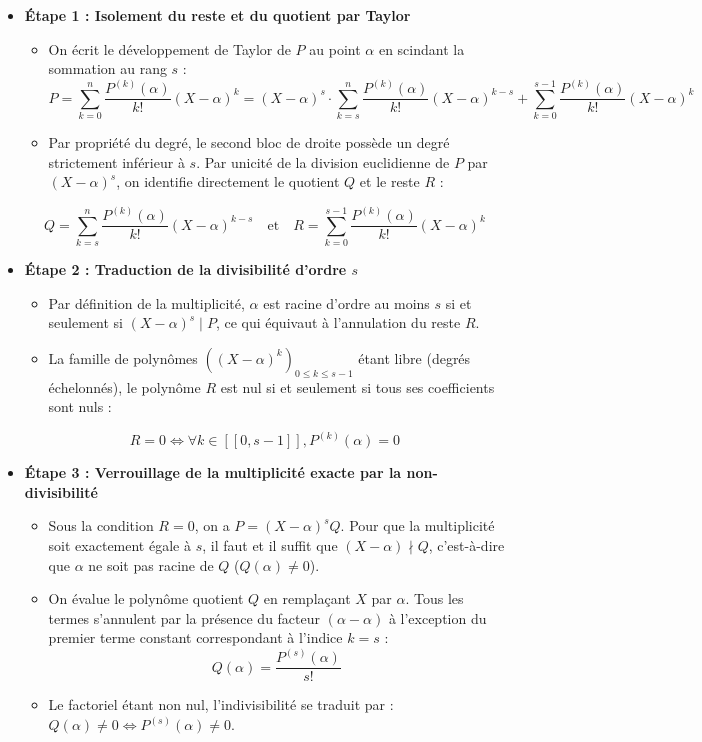 \documentclass[11pt, a4paper]{article}
\theoremstyle{definition}
\begin{document}
\begin{itemize}
\item \textbf{Étape 1 : Isolement du reste et du quotient par Taylor}
  \begin{itemize}
  \item On écrit le développement de Taylor de $P$ au point $\alpha$ en scindant la sommation au rang $s$ :
\[
P = \sum_{k=0}^n \frac{P^{(k)}(\alpha)}{k!}(X-\alpha)^k = (X-\alpha)^s \cdot \sum_{k=s}^n \frac{P^{(k)}(\alpha)}{k!}(X-\alpha)^{k-s} + \sum_{k=0}^{s-1} \frac{P^{(k)}(\alpha)}{k!}(X-\alpha)^k
\]
  \item Par propriété du degré, le second bloc de droite possède un degré strictement inférieur à $s$. Par unicité de la division euclidienne de $P$ par $(X-\alpha)^s$, on identifie directement le quotient $Q$ et le reste $R$ :
  \end{itemize}
\[
Q = \sum_{k=s}^n \frac{P^{(k)}(\alpha)}{k!}(X-\alpha)^{k-s} \quad \text{et} \quad R = \sum_{k=0}^{s-1} \frac{P^{(k)}(\alpha)}{k!}(X-\alpha)^k
\]
\item \textbf{Étape 2 : Traduction de la divisibilité d'ordre $s$}
  \begin{itemize}
  \item Par définition de la multiplicité, $\alpha$ est racine d'ordre au moins $s$ si et seulement si $(X-\alpha)^s \mid P$, ce qui équivaut à l'annulation du reste $R$.
  \item La famille de polynômes $\left((X-\alpha)^k\right)_{0 \le k \le s-1}$ étant libre (degrés échelonnés), le polynôme $R$ est nul si et seulement si tous ses coefficients sont nuls :
  \end{itemize}
\[
R = 0 \iff \forall k \in [\![0, s-1]\!], P^{(k)}(\alpha) = 0
\]
\item \textbf{Étape 3 : Verrouillage de la multiplicité exacte par la non-divisibilité}
  \begin{itemize}
  \item Sous la condition $R=0$, on a $P = (X-\alpha)^s Q$. Pour que la multiplicité soit exactement égale à $s$, il faut et il suffit que $(X-\alpha) \nmid Q$, c'est-à-dire que $\alpha$ ne soit pas racine de $Q$ ($Q(\alpha) \neq 0$).
  \item On évalue le polynôme quotient $Q$ en remplaçant $X$ par $\alpha$. Tous les termes s'annulent par la présence du facteur $(\alpha-\alpha)$ à l'exception du premier terme constant correspondant à l'indice $k=s$ :
\[
Q(\alpha) = \frac{P^{(s)}(\alpha)}{s!}
\]
  \item Le factoriel étant non nul, l'indivisibilité se traduit par : $Q(\alpha) \neq 0 \iff P^{(s)}(\alpha) \neq 0$.
  \end{itemize}
\end{itemize}
\end{document}
